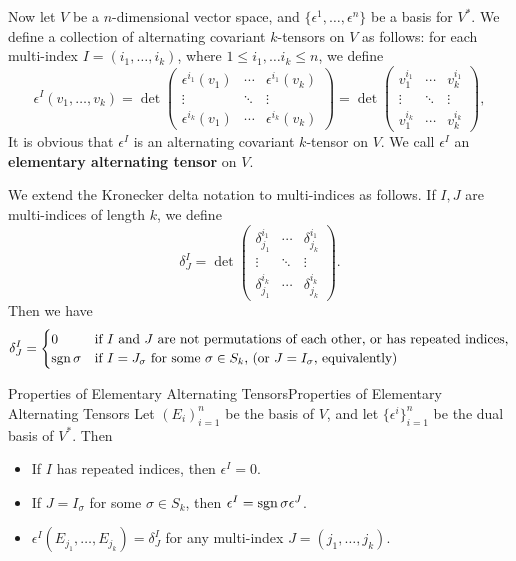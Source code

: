 \documentclass[../main.tex]{subfiles}
\begin{document}
Now let $V$ be a $n$-dimensional vector space, and $\{\epsilon^1, \dots, \epsilon^n\}$ be a basis for $V^*$. We define a collection of alternating covariant $k$-tensors on $V$ as follows: for each multi-index $I = (i_1, \dots, i_k)$, where $1 \leq i_1, \ldots i_k \leq n$, we define
\begin{equation}
  \epsilon^I(v_1, \dots, v_k) = \det\begin{pmatrix}
    \epsilon^{i_1}(v_1) & \cdots & \epsilon^{i_1}(v_k) \\
    \vdots & \ddots & \vdots \\
    \epsilon^{i_k}(v_1) & \cdots & \epsilon^{i_k}(v_k)
    \end{pmatrix} = \det \begin{pmatrix}
    v_1^{i_1} & \cdots & v_k^{i_1} \\
    \vdots & \ddots & \vdots \\
    v_1^{i_k} & \cdots & v_k^{i_k}
    \end{pmatrix},
\end{equation}
It is obvious that $\epsilon^I$ is an alternating covariant $k$-tensor on $V$. We call $\epsilon^I$ an \textbf{elementary alternating tensor} on $V$.

We extend the Kronecker delta notation to multi-indices as follows. If $I,J$ are multi-indices of length $k$, we define
\begin{equation}
  \delta^I_J = \det\begin{pmatrix}
    \delta^{i_1}_{j_1} & \cdots & \delta^{i_1}_{j_k} \\
    \vdots & \ddots & \vdots \\
    \delta^{i_k}_{j_1} & \cdots & \delta^{i_k}_{j_k}
    \end{pmatrix}.
\end{equation}
Then we have
\begin{equation*}
  \delta^I_J = \begin{cases}
    0 & \text{if $I$ and $J$ are not permutations of each other, or has repeated indices,} \\
    \operatorname{sgn}\sigma & \text{if $I = J_\sigma$ for some $\sigma \in S_k$, (or $J = I_\sigma$, equivalently)}
  \end{cases}
\end{equation*}

\begin{lemma}{Properties of Elementary Alternating Tensors}{Properties of Elementary Alternating Tensors}
  Let $(E_i)_{i=1}^n$ be the basis of $V$, and let $\{\epsilon^i\}_{i=1}^n$ be the dual basis of $V^*$. Then
  \begin{itemize}
    \item If $I$ has repeated indices, then $\epsilon^I = 0$.
    \item If $J = I_\sigma$ for some $\sigma \in S_k$, then $\epsilon^I = \operatorname{sgn}\sigma \epsilon^J$.
    \item $\epsilon^I(E_{j_1}, \dots, E_{j_k}) = \delta^I_J$ for any multi-index $J = (j_1, \dots, j_k)$.
  \end{itemize}
\end{lemma}
\end{document}
